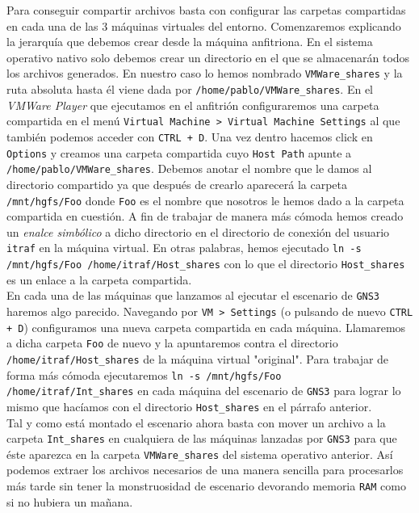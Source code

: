 \documentclass[11pt]{article}
\begin{document}
            Para conseguir compartir archivos basta con configurar las carpetas compartidas en cada una de las $3$ máquinas virtuales del entorno. Comenzaremos explicando la jerarquía que debemos crear desde la máquina anfitriona. En el sistema operativo nativo solo debemos crear un directorio en el que se almacenarán todos los archivos generados. En nuestro caso lo hemos nombrado \texttt{VMWare\_shares} y la ruta absoluta hasta él viene dada por \texttt{/home/pablo/VMWare\_shares}. En el \textit{VMWare Player} que ejecutamos en el anfitrión configuraremos una carpeta compartida en el menú \texttt{Virtual Machine > Virtual Machine Settings} al que también podemos acceder con \texttt{CTRL + D}. Una vez dentro hacemos click en \texttt{Options} y creamos una carpeta compartida cuyo \texttt{Host Path} apunte a \texttt{/home/pablo/VMWare\_shares}. Debemos anotar el nombre que le damos al directorio compartido ya que después de crearlo aparecerá la carpeta \texttt{/mnt/hgfs/Foo} donde \texttt{Foo} es el nombre que nosotros le hemos dado a la carpeta compartida en cuestión. A fin de trabajar de manera más cómoda hemos creado un \textit{enalce simbólico} a dicho directorio en el directorio de conexión del usuario \texttt{itraf} en la máquina virtual. En otras palabras, hemos ejecutado \texttt{ln -s /mnt/hgfs/Foo /home/itraf/Host\_shares} con lo que el directorio \texttt{Host\_shares} es un enlace a la carpeta compartida.\\

            En cada una de las máquinas que lanzamos al ejecutar el escenario de \texttt{GNS3} haremos algo parecido. Navegando por \texttt{VM > Settings} (o pulsando de nuevo \texttt{CTRL + D}) configuramos una nueva carpeta compartida en cada máquina. Llamaremos a dicha carpeta \texttt{Foo} de nuevo y la apuntaremos contra el directorio \texttt{/home/itraf/Host\_shares} de la máquina virtual "original". Para trabajar de forma más cómoda ejecutaremos \texttt{ln -s /mnt/hgfs/Foo /home/itraf/Int\_shares} en cada máquina del escenario de \texttt{GNS3} para lograr lo mismo que hacíamos con el directorio \texttt{Host\_shares} en el párrafo anterior.\\

            Tal y como está montado el escenario ahora basta con mover un archivo a la carpeta \texttt{Int\_shares} en cualquiera de las máquinas lanzadas por \texttt{GNS3} para que éste aparezca en la carpeta \texttt{VMWare\_shares} del sistema operativo anterior. Así podemos extraer los archivos necesarios de una manera sencilla para procesarlos más tarde sin tener la monstruosidad de escenario devorando memoria \texttt{RAM} como si no hubiera un mañana.
\end{document}
